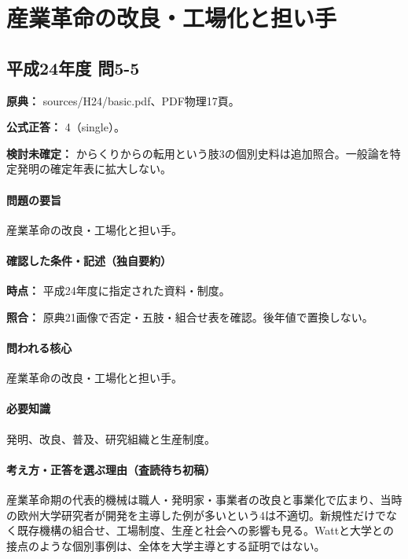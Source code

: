 \section{産業革命の改良・工場化と担い手}

\subsection{平成24年度 問5-5}
\label{q:h24-reg-basic-5-5}

\noindent\textbf{原典：} sources/H24/basic.pdf、PDF物理17頁。

\textbf{公式正答：} 4（single）。

\par\textbf{検討未確定：} からくりからの転用という肢3の個別史料は追加照合。一般論を特定発明の確定年表に拡大しない。

\paragraph{問題の要旨} 産業革命の改良・工場化と担い手。

\paragraph{確認した条件・記述（独自要約）}\mbox{}\par

\noindent\textbf{時点：} 平成24年度に指定された資料・制度。\par

\noindent\textbf{照合：} 原典21画像で否定・五肢・組合せ表を確認。後年値で置換しない。\par

\paragraph{問われる核心} 産業革命の改良・工場化と担い手。

\paragraph{必要知識} 発明、改良、普及、研究組織と生産制度。

\paragraph{考え方・正答を選ぶ理由（査読待ち初稿）} 産業革命期の代表的機械は職人・発明家・事業者の改良と事業化で広まり、当時の欧州大学研究者が開発を主導した例が多いという4は不適切。新規性だけでなく既存機構の組合せ、工場制度、生産と社会への影響も見る。Wattと大学との接点のような個別事例は、全体を大学主導とする証明ではない。


